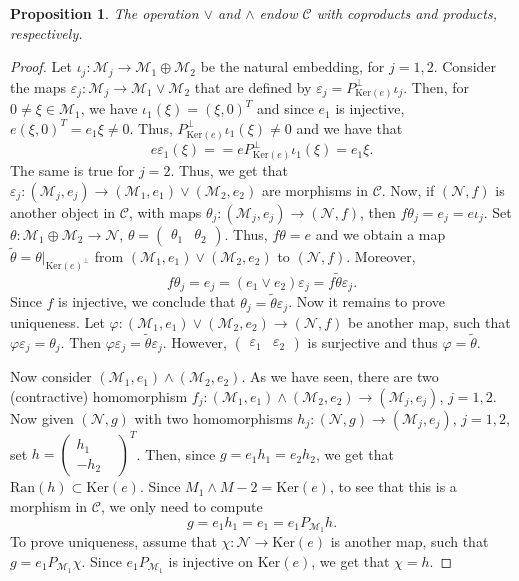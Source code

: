 \documentclass[11pt]{article}
\newcommand{\ran}[1]{\ensuremath{\mathrm{Ran} \left( {#1} \right) }}
\renewcommand{\ker}[1]{\ensuremath{\mathrm{Ker} \left( {#1} \right) }}
\newcommand{\cC}{\ensuremath{\mathcal{C}}}
\newcommand{\sM}{\ensuremath{\mathscr{M}}}
\newcommand{\sN}{\ensuremath{\mathscr{N}}}
\numberwithin{equation}{section}
\numberwithin{subsection}{section}
\newtheorem{prop}[subsection]{Proposition}
\theoremstyle{definition}
\begin{document}
\begin{prop} \label{prop:coproduct}
The operation $\vee$ and $\wedge$ endow $\cC$ with coproducts and products, respectively.
\end{prop}
\begin{proof}
Let $\iota_j \colon \sM_j \to \sM_1 \oplus \sM_2$ be the natural embedding, for $j =1,2$. Consider the maps $\varepsilon_j \colon \sM_j \to \sM_1 \vee \sM_2$ that are defined by $\varepsilon_j = P_{\ker{e}}^{\perp} \iota_j$. Then, for $0 \neq \xi \in \sM_1$, we have $\iota_1(\xi) = (\xi,0)^T$ and since $e_1$ is injective, $e(\xi,0)^T = e_1 \xi \neq 0$. Thus, $P_{\ker{e}}^{\perp} \iota_1(\xi) \neq 0$ and we have that 
\[
e \varepsilon_1(\xi) = =e P_{\ker{e}}^{\perp} \iota_1(\xi) = e_1 \xi.
\]
The same is true for $j=2$. Thus, we get that $\varepsilon_j \colon (\sM_j,e_j) \to (\sM_1,e_1) \vee (\sM_2,e_2)$ are morphisms in $\cC$. Now, if $(\sN,f)$ is another object in $\cC$, with maps $\theta_j \colon (\sM_j,e_j) \to (\sN,f)$, then $f \theta_j = e_j = e \iota_j$. Set $\theta \colon \sM_1 \oplus \sM_2 \to \sN$, $\theta =\left(\begin{smallmatrix} \theta_1 & \theta_2 \end{smallmatrix} \right)$. Thus, $f \theta = e$ and we obtain a map $\widetilde{\theta} = \theta|_{\ker{e}^{\perp}}$ from  $(\sM_1,e_1) \vee (\sM_2,e_2)$ to $(\sN,f)$. Moreover,
\[
f \theta_j = e_j = (e_1 \vee e_2) \varepsilon_j = f \widetilde{\theta} \varepsilon_j.
\]
Since $f$ is injective, we conclude that $\theta_j = \widetilde{\theta} \varepsilon_j$. Now it remains to prove uniqueness. Let $\varphi \colon (\sM_1,e_1) \vee (\sM_2,e_2) \to (\sN,f)$ be another map, such that $\varphi \varepsilon_j = \theta_j$. Then $\varphi \varepsilon_j = \widetilde{\theta} \varepsilon_j$. However, $\left(\begin{smallmatrix} \varepsilon_1 & \varepsilon_2 \end{smallmatrix} \right)$ is surjective and thus $\varphi = \widetilde{\theta}$.

Now consider $(\sM_1,e_1) \wedge (\sM_2,e_2)$. As we have seen, there are two (contractive) homomorphism $f_j \colon (\sM_1,e_1) \wedge (\sM_2,e_2) \to (\sM_j,e_j)$, $j=1,2$. Now given $(\sN,g)$ with two homomorphisms $h_j \colon (\sN,g) \to (\sM_j,e_j) $, $j=1,2$, set $h = \left(\begin{smallmatrix} h_1 & \\ - h_2 \end{smallmatrix} \right)^T$. Then, since $g = e_1 h_1 = e_2 h_2$, we get that $\ran{h} \subset \ker{e}$. Since $M_1 \wedge M-2 = \ker{e}$, to see that this is a morphism in $\cC$, we only need to compute
\[
g = e_1 h_1 = e_1 = e_1 P_{\sM_1} h.
\]
To prove uniqueness, assume that $\chi \colon \sN \to \ker{e}$ is another map, such that $g = e_1 P_{\sM_1} \chi$. Since $e_1 P_{\sM_1}$ is injective on $\ker{e}$, we get that $\chi = h$.
\end{proof}
\end{document}
